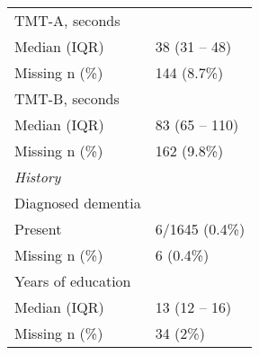 \begin{table}
\begin{longtable}{ll}
TMT-A, seconds &  \\ 
\quad Median (IQR) & 38 (31 -- 48) \\ 
\quad Missing n (\%) & 144 (8.7\%) \\ 
TMT-B, seconds &  \\ 
\quad Median (IQR) & 83 (65 -- 110) \\ 
\quad Missing n (\%) & 162 (9.8\%) \\ 
\rule{0pt}{3ex}    
\emph{History}\\
\hline
Diagnosed dementia & \\
\quad Present & 6/1645 (0.4\%)\\
\quad Missing n (\%) & 6 (0.4\%) \\
Years of education &  \\ 
\quad Median (IQR) & 13 (12 -- 16) \\ 
\quad Missing n (\%) & 34 (2\%) \\ 
\bottomrule
\end{longtable}
\addtocounter{table}{-1}
\label{tab:democog}
\end{table}
